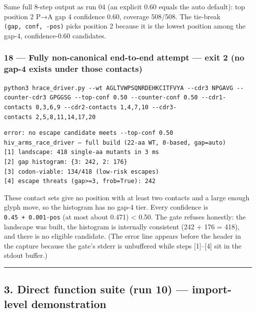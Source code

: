 Same full 8-step output as run 04 (an explicit 0.60 equals the auto
default): top position 2 P→A gap 4 confidence 0.60, coverage 508/508.
The tie-break \texttt{(gap,\ conf,\ -pos)} picks position 2 because it
is the lowest position among the gap-4, confidence-0.60 candidates.

\hypertarget{fully-non-canonical-end-to-end-attempt-exit-2-no-gap-4-exists-under-those-contacts}{%
\subsubsection{18 --- Fully non-canonical end-to-end attempt --- exit 2
(no gap-4 exists under those
contacts)}\label{fully-non-canonical-end-to-end-attempt-exit-2-no-gap-4-exists-under-those-contacts}}

\texttt{python3\ hrace\_driver.py\ -\/-wt\ AGLTVWPSQNRDEHKCITFVYA\ -\/-cdr3\ NPGAVG\ -\/-counter-cdr3\ GPGGSG\ -\/-top-conf\ 0.50\ -\/-counter-conf\ 0.50\ -\/-cdr1-contacts\ 0,3,6,9\ -\/-cdr2-contacts\ 1,4,7,10\ -\/-cdr3-contacts\ 2,5,8,11,14,17,20}

\begin{verbatim}
error: no escape candidate meets --top-conf 0.50
hiv_arms_race_driver — full build (22-aa WT, 0-based, gap=auto)
[1] landscape: 418 single-aa mutants in 3 ms
[2] gap histogram: {3: 242, 2: 176}
[3] codon-viable: 134/418 (low-risk escapes)
[4] escape threats (gap>=3, frob=True): 242
\end{verbatim}

These contact sets give no position with at least two contacts and a
large enough glyph move, so the histogram has no gap-4 tier. Every
confidence is \texttt{0.45\ +\ 0.001·pos} (at most about 0.471)
\textless{} 0.50. The gate refuses honestly: the landscape was built,
the histogram is internally consistent (242 + 176 = 418), and there is
no eligible candidate. (The error line appears before the header in the
capture because the gate's stderr is unbuffered while steps
{[}1{]}--{[}4{]} sit in the stdout buffer.)

\begin{center}\rule{0.5\linewidth}{0.5pt}\end{center}

\hypertarget{direct-function-suite-run-10-import-level-demonstration}{%
\subsection{3. Direct function suite (run 10) --- import-level
demonstration}\label{direct-function-suite-run-10-import-level-demonstration}}

